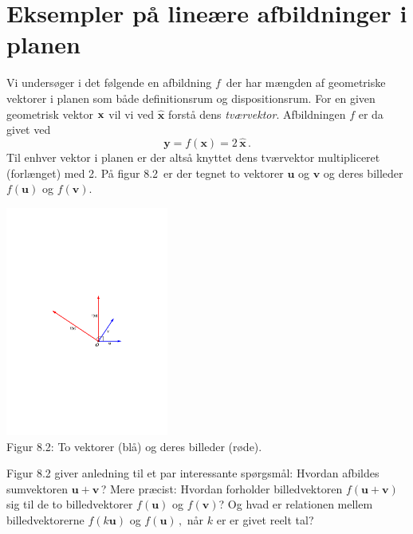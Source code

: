 \section{Eksempler på lineære afbildninger i planen}

Vi undersøger i det følgende en afbildning $f\,$ der har mængden af geometriske vektorer i planen som både definitionsrum og dispositionsrum. For en given geometrisk vektor $\mathbf{x}$ vil vi ved $\hat{\mathbf x}$ forstå dens \textit{tværvektor}. Afbildningen $f$ er da givet ved  
\begin{equation}
\mathbf y =f(\mathbf x)=2\,\hat{\mathbf x}\,.
\end{equation}
Til enhver vektor i planen er der altså knyttet dens tværvektor multipliceret (forlænget) med 2. På figur 8.2\, er der tegnet to vektorer $\mathbf u$ og $\mathbf v$ og deres billeder $f(\mathbf u)$ og $f(\mathbf v)$.

\begin{center}
		\includegraphics[trim=5cm 11cm 5cm
 11cm,width=0.40\textwidth,clip]{tvarVektor2.pdf}
  \\Figur 8.2: To vektorer (blå) og deres billeder (røde). 
\end{center}

Figur 8.2 giver anledning til et par interessante spørgsmål: Hvordan afbildes sumvektoren $\mathbf u +\mathbf v\,$? Mere præcist: Hvordan forholder billedvektoren $f(\mathbf u + \mathbf v)$ sig til de to billedvektorer $f(\mathbf u)$ og $f(\mathbf v)$? Og hvad er relationen mellem billedvektorerne $f(k\mathbf u)$ og  $f(\mathbf u)\,,$ når $k$ er er givet reelt tal?

